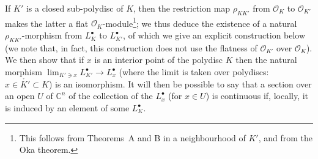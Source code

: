 \documentclass[british]{article}
\begin{document}
If \(K'\) is a closed sub-polydisc of \(K\), then the restriction map
\(\rho_{KK'}\) from \({\mathscr{O}}_K\) to \({\mathscr{O}}_{K'}\) makes
the latter a flat \({\mathscr{O}}_K\)-module\footnote{This follows from
  Theorems~A and B in a neighbourhood of \(K'\), and from the Oka
  theorem.}; we thus deduce the existence of a natural
\(\rho_{KK'}\)-morphism from \(L_K^\bullet\) to \(L_{K'}^\bullet\), of
which we give an explicit construction below (we note that, in fact,
this construction does not use the flatness of \({\mathscr{O}}_{K'}\)
over \({\mathscr{O}}_K\)). We then show that if \(x\) is an interior
point of the polydisc \(K\) then the natural morphism
\(\lim_{K'\ni x}L_{K'}^\bullet\to L_x^\bullet\) (where the limit is
taken over polydiscs: \(x\in\mathring{K'}\subset K\)) is an isomorphism.
It will then be possible to say that a section over an open \(U\) of
\(\mathbb{C}^n\) of the collection of the \(L_x^\bullet\) (for
\(x\in U\)) is continuous if, locally, it is induced by an element of
some \(L_K^\bullet\).
\end{document}

